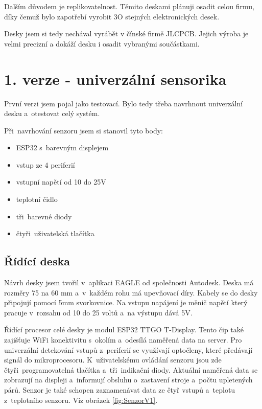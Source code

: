 Dalším důvodem je replikovatelnost. Těmito deskami plánuji osadit celou firmu, díky čemuž bylo zapotřebí vyrobit 3O stejných elektronických desek.

Desky jsem si tedy nechával vyrábět v čínské firmě JLCPCB. Jejich výroba je velmi precizní a dokáží desku i osadit vybranými součástkami.



\section{1. verze - univerzální sensorika}

První verzi jsem pojal jako testovací. Bylo tedy třeba navrhnout univerzální desku a~otestovat celý systém.\newline

Při~navrhování senzoru jsem si stanovil tyto body:
\begin{itemize}
    \item ESP32 s~barevným displejem
    \item vstup ze 4 periferií
    \item vstupní napětí od 10 do 25V
    \item teplotní čidlo
    \item tři~barevné diody
    \item čtyři~uživatelská tlačítka
\end{itemize}


\subsection{Řídící deska}
Návrh desky jsem tvořil v~aplikaci EAGLE od společnosti Autodesk. 
Deska má rozměry 75 na 60 mm a~v~každém rohu má upevňovací díry. 
Kabely se do desky připojují pomocí 5mm svorkovnice.
Na vstupu napájení je měnič napětí který pracuje v~rozsahu od 10 do 25 voltů a~na výstupu dává 5V. 

Řídící procesor celé desky je modul ESP32 TTGO T-Display.
Tento čip také zajišťuje WiFi konektivitu s~okolím a~odesílá naměřená data na server.
Pro univerzální detekování vstupů z~periferií se využívají optočleny, které předávají signál do mikroprocesoru.
K~uživatelskému ovládání senzoru jsou zde čtyři~programovatelná tlačítka a~tři~indikační diody.
Aktuální naměřená data se zobrazují na displeji a~informují obsluhu o~zastavení stroje a~počtu upletených párů.
Senzor je také schopen zaznamenávat data ze čtyř vstupů a~teplotu z~teplotního senzoru. Viz obrázek \ref{fig:SenzorV1}.

